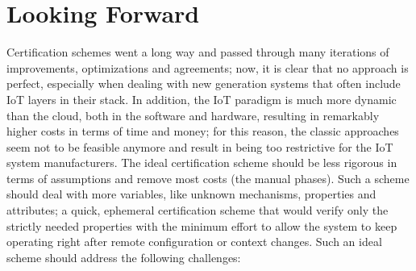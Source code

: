 \section{Looking Forward}
Certification schemes went a long way and passed through many iterations of improvements, optimizations and agreements; now, it is clear that no approach is perfect, especially when dealing with new generation systems that often include IoT layers in their stack. In addition, the IoT paradigm is much more dynamic than the cloud, both in the software and hardware, resulting in remarkably higher costs in terms of time and money; for this reason, the classic approaches seem not to be feasible anymore and result in being too restrictive for the IoT system manufacturers. The ideal certification scheme should be less rigorous in terms of assumptions and remove most costs (the manual phases). Such a scheme should deal with more variables, like unknown mechanisms, properties and attributes; a quick, ephemeral certification scheme that would verify only the strictly needed properties with the minimum effort to allow the system to keep operating right after remote configuration or context changes. Such an ideal scheme should address the following challenges:
